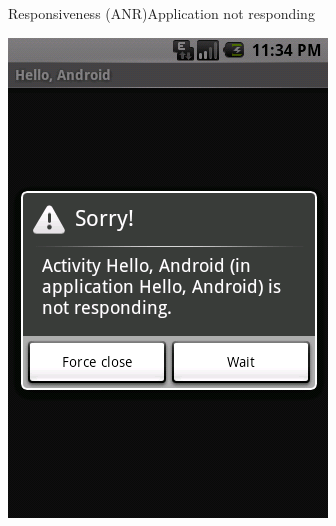 \begin{frame}{Responsiveness (ANR)}{Application not responding}
\begin{center}
\includegraphics[scale=0.3]{images/anr}
\end{center}
\end{frame}

